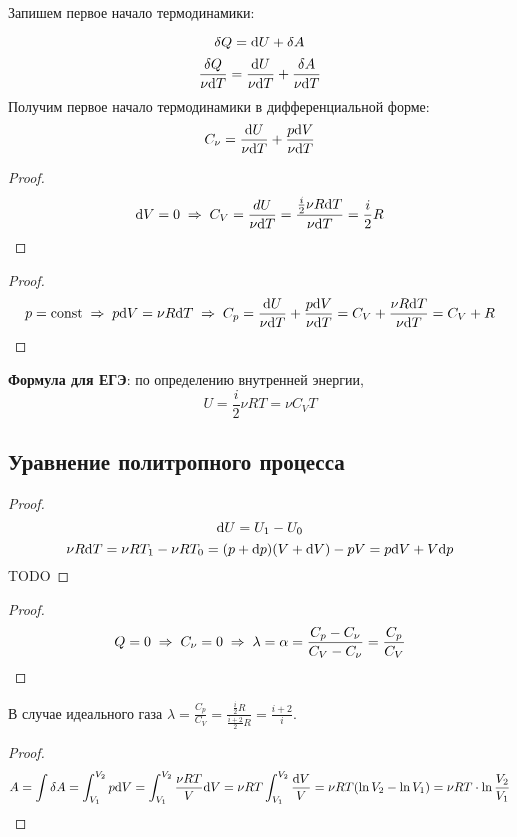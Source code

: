 Запишем первое начало термодинамики:\par
\[\delta Q = \text{d} U + \delta A\]
\[\frac{\delta Q}{\nu \text{d} T} = \frac{\text{d} U}{\nu \text{d} T} + \frac{\delta A}{\nu \text{d} T}\]
Получим первое начало термодинамики в дифференциальной форме:
\[C_\nu=\frac{\text{d} U}{\nu \text{d} T} + \frac{p \text{d} V}{\nu \text{d} T}\]

\begin{proof}
	\[\text{d} V = 0 \;\Rightarrow\; C_V = \frac{dU}{\nu \text{d} T} = \frac{\frac{i}{2}\nu R \text{d} T}{\nu \text{d} T} = \frac{i}{2}R \]
\end{proof}

\begin{proof}
	\[p =\text{const} \;\Rightarrow\; p\text{d} V = \nu R \text{d} T \;\Rightarrow\; C_p = \frac{\text{d} U}{\nu \text{d} T} + \frac{p \text{d} V}{\nu \text{d} T} = C_V + \frac{\nu R \text{d} T}{\nu \text{d} T} = C_V + R\]
\end{proof}

\textbf{Формула для ЕГЭ}: по определению внутренней энергии,
\[U = \frac{i}{2} \nu R T = \nu C_V T\]



\subsection{Уравнение политропного процесса}
\begin{proof}
	\[ \text{d} U = U_1 - U_0 \]
	\[ \nu R \text{d} T = \nu R T_1 - \nu R T_0 = (p + \text{d} p)(V + \text{d} V) - pV = p \text{d} V + V \text{d} p \]
	TODO\par
\end{proof}

\begin{proof}
	\[Q = 0 \;\Rightarrow\; C_\nu = 0 \;\Rightarrow\; \lambda = \alpha = \frac{C_p - C_\nu}{C_V - C_\nu} = \frac{C_p}{C_V}\]
\end{proof}
В случае идеального газа $\displaystyle \lambda = \frac{C_p}{C_V} = \frac{\frac{i}{2}R}{\frac{i + 2}{2}R} = \frac{i + 2}{i}$.

\begin{proof}
	\[A = \int \delta A = 
	\int_{V_1}^{V_2}{p \text{d} V} = 
	\int_{V_1}^{V_2}{\frac{\nu R T}{V} \text{d} V} =
	\nu R T \int_{V_1}^{V_2}{\frac{\text{d} V}{V}} = 
	\nu R T (\ln{V_2} - \ln{V_1}) = \nu R T \cdot \ln{\frac{V_2}{V_1}} \]
\end{proof}
